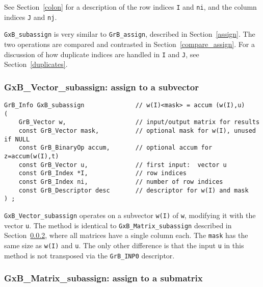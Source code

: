 \documentclass[12pt]{article}
\begin{document}
See Section~\ref{colon} for a description of the row indices
\verb'I' and \verb'ni', and the column indices
\verb'J' and \verb'nj'.

\verb'GxB_subassign' is very similar to \verb'GrB_assign', described in
Section~\ref{assign}.  The two operations are compared and contrasted in
Section~\ref{compare_assign}.  For a discussion of how duplicate indices
are handled in \verb'I' and \verb'J', see Section~\ref{duplicates}.

\subsubsection{{\sf GxB\_Vector\_subassign:} assign to a subvector }
\label{subassign_vector}

\begin{mdframed}[userdefinedwidth=6in]
{\footnotesize
\begin{verbatim}
GrB_Info GxB_subassign              // w(I)<mask> = accum (w(I),u)
(
    GrB_Vector w,                   // input/output matrix for results
    const GrB_Vector mask,          // optional mask for w(I), unused if NULL
    const GrB_BinaryOp accum,       // optional accum for z=accum(w(I),t)
    const GrB_Vector u,             // first input:  vector u
    const GrB_Index *I,             // row indices
    const GrB_Index ni,             // number of row indices
    const GrB_Descriptor desc       // descriptor for w(I) and mask
) ;
\end{verbatim} } \end{mdframed}

\verb'GxB_Vector_subassign' operates on a subvector \verb'w(I)' of \verb'w',
modifying it with the vector \verb'u'.  The method is identical to
\verb'GxB_Matrix_subassign' described in Section~\ref{subassign_matrix}, where
all matrices have a single column each.  The \verb'mask' has the same size as
\verb'w(I)' and \verb'u'.  The only other difference is that the input \verb'u'
in this method is not transposed via the \verb'GrB_INP0' descriptor.

\newpage
\subsubsection{{\sf GxB\_Matrix\_subassign:} assign to a submatrix }
\label{subassign_matrix}
\end{document}
